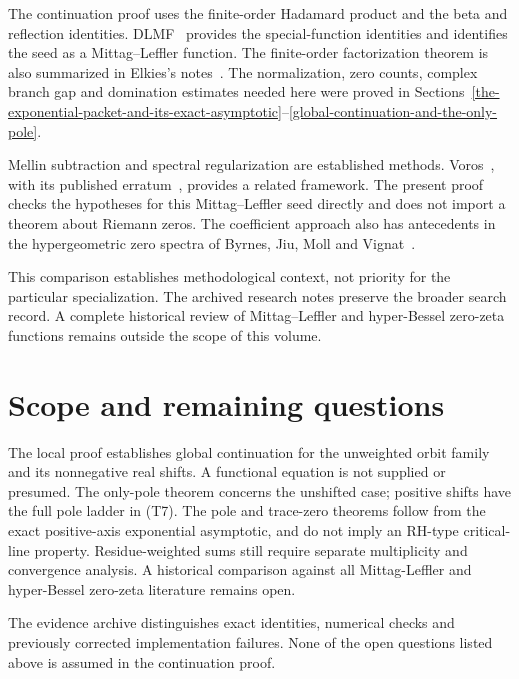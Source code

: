 The continuation proof uses the finite-order Hadamard product and the beta
and reflection identities. DLMF~\cite[\S\S5.5, 5.12 and 10.46]{DLMF}
provides the special-function identities and identifies the seed as a
Mittag--Leffler function. The finite-order factorization theorem is also
summarized in Elkies's notes~\cite{Elkies}. The normalization, zero counts,
complex branch gap and domination estimates needed here were proved in
Sections~\ref{the-exponential-packet-and-its-exact-asymptotic}--\ref{global-continuation-and-the-only-pole}.

Mellin subtraction and spectral regularization are established methods.
Voros~\cite[\S\S2.1--2.2]{Voros2003}, with its published erratum~\cite{Voros2004},
provides a related framework. The present proof checks the hypotheses for
this Mittag--Leffler seed directly and does not import a theorem about
Riemann zeros. The coefficient approach also has antecedents in the
hypergeometric zero spectra of Byrnes, Jiu, Moll and Vignat~\cite{Byrnes2013}.

This comparison establishes methodological context, not priority for the
particular specialization. The archived research notes preserve the broader
search record. A complete historical review of Mittag--Leffler and
hyper-Bessel zero-zeta functions remains outside the scope of this volume.

\hypertarget{scope-and-remaining-questions}{%
\section{Scope and remaining
questions}\label{scope-and-remaining-questions}}

The local proof establishes global continuation for the unweighted orbit
family and its nonnegative real shifts. A functional
equation is not supplied or presumed. The only-pole theorem concerns the
unshifted case; positive shifts have the full pole ladder in (T7). The
pole and trace-zero theorems follow from the exact positive-axis
exponential asymptotic, and do not imply an RH-type critical-line
property. Residue-weighted sums still require separate multiplicity and
convergence analysis. A historical comparison against all Mittag-Leffler
and hyper-Bessel zero-zeta literature remains open.

The evidence archive distinguishes exact identities, numerical checks and
previously corrected implementation failures. None of the open questions
listed above is assumed in the continuation proof.
